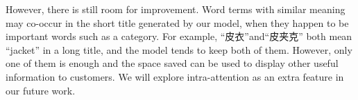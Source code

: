 However, there is still room for improvement.
Word terms with similar meaning may co-occur
in the short title generated by our model,
when they happen to be important words such as a category.
For example, 
``皮衣''and``皮夹克'' both mean ``jacket'' in a long title,
and the model tends to keep both of them.
However, only one of them is enough and
the space saved can be used to display other useful information to customers.
We will explore intra-attention \cite{paulus2017deep} as an extra feature in our future work.



